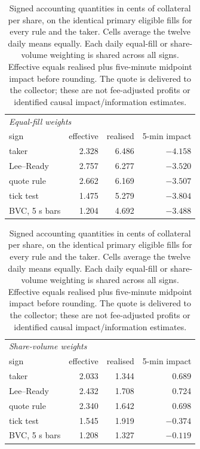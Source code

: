 \begin{table}[htbp]
\centering\footnotesize
\begin{tabular}{lrrr}
\toprule
\multicolumn{4}{l}{\emph{Equal-fill weights}} \\
sign & effective & realised & 5-min impact \\
\midrule
taker & 2.328 & 6.486 & $-4.158$ \\
Lee--Ready & 2.757 & 6.277 & $-3.520$ \\
quote rule & 2.662 & 6.169 & $-3.507$ \\
tick test & 1.475 & 5.279 & $-3.804$ \\
BVC, 5 s bars & 1.204 & 4.692 & $-3.488$ \\
\bottomrule
\end{tabular}
\par\medskip
\begin{tabular}{lrrr}
\toprule
\multicolumn{4}{l}{\emph{Share-volume weights}} \\
sign & effective & realised & 5-min impact \\
\midrule
taker & 2.033 & 1.344 & 0.689 \\
Lee--Ready & 2.432 & 1.708 & 0.724 \\
quote rule & 2.340 & 1.642 & 0.698 \\
tick test & 1.545 & 1.919 & $-0.374$ \\
BVC, 5 s bars & 1.208 & 1.327 & $-0.119$ \\
\bottomrule
\end{tabular}
\caption{Signed accounting quantities in cents of collateral per share, on the identical primary eligible fills for every rule and the taker. Cells average the twelve daily means equally. Each daily equal-fill or share-volume weighting is shared across all signs. Effective equals realised plus five-minute midpoint impact before rounding. The quote is delivered to the collector; these are not fee-adjusted profits or identified causal impact/information estimates.}
\label{tab:cached-economic-means}
\end{table}
